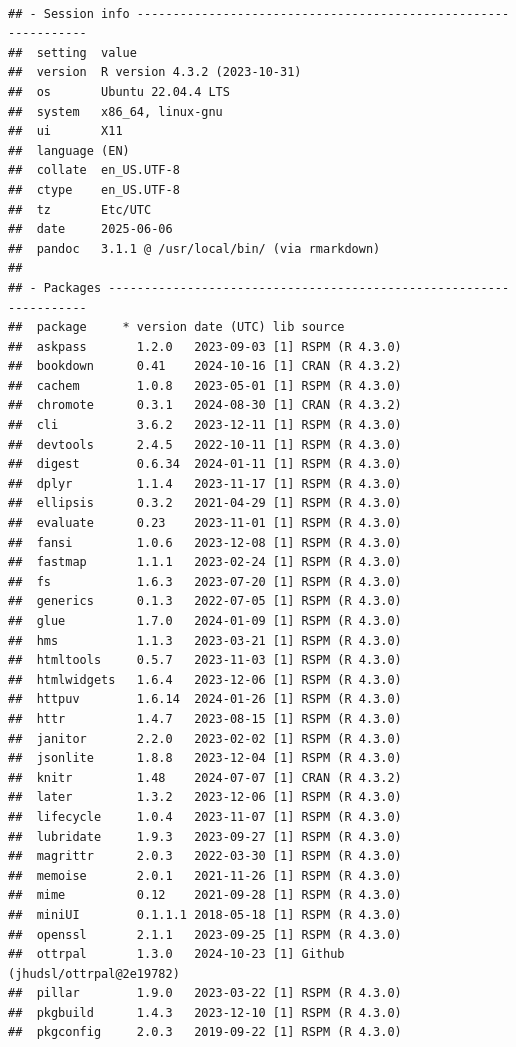 \documentclass[
]{book}
\begin{document}
~

\begin{verbatim}
## - Session info ---------------------------------------------------------------
##  setting  value
##  version  R version 4.3.2 (2023-10-31)
##  os       Ubuntu 22.04.4 LTS
##  system   x86_64, linux-gnu
##  ui       X11
##  language (EN)
##  collate  en_US.UTF-8
##  ctype    en_US.UTF-8
##  tz       Etc/UTC
##  date     2025-06-06
##  pandoc   3.1.1 @ /usr/local/bin/ (via rmarkdown)
## 
## - Packages -------------------------------------------------------------------
##  package     * version date (UTC) lib source
##  askpass       1.2.0   2023-09-03 [1] RSPM (R 4.3.0)
##  bookdown      0.41    2024-10-16 [1] CRAN (R 4.3.2)
##  cachem        1.0.8   2023-05-01 [1] RSPM (R 4.3.0)
##  chromote      0.3.1   2024-08-30 [1] CRAN (R 4.3.2)
##  cli           3.6.2   2023-12-11 [1] RSPM (R 4.3.0)
##  devtools      2.4.5   2022-10-11 [1] RSPM (R 4.3.0)
##  digest        0.6.34  2024-01-11 [1] RSPM (R 4.3.0)
##  dplyr         1.1.4   2023-11-17 [1] RSPM (R 4.3.0)
##  ellipsis      0.3.2   2021-04-29 [1] RSPM (R 4.3.0)
##  evaluate      0.23    2023-11-01 [1] RSPM (R 4.3.0)
##  fansi         1.0.6   2023-12-08 [1] RSPM (R 4.3.0)
##  fastmap       1.1.1   2023-02-24 [1] RSPM (R 4.3.0)
##  fs            1.6.3   2023-07-20 [1] RSPM (R 4.3.0)
##  generics      0.1.3   2022-07-05 [1] RSPM (R 4.3.0)
##  glue          1.7.0   2024-01-09 [1] RSPM (R 4.3.0)
##  hms           1.1.3   2023-03-21 [1] RSPM (R 4.3.0)
##  htmltools     0.5.7   2023-11-03 [1] RSPM (R 4.3.0)
##  htmlwidgets   1.6.4   2023-12-06 [1] RSPM (R 4.3.0)
##  httpuv        1.6.14  2024-01-26 [1] RSPM (R 4.3.0)
##  httr          1.4.7   2023-08-15 [1] RSPM (R 4.3.0)
##  janitor       2.2.0   2023-02-02 [1] RSPM (R 4.3.0)
##  jsonlite      1.8.8   2023-12-04 [1] RSPM (R 4.3.0)
##  knitr         1.48    2024-07-07 [1] CRAN (R 4.3.2)
##  later         1.3.2   2023-12-06 [1] RSPM (R 4.3.0)
##  lifecycle     1.0.4   2023-11-07 [1] RSPM (R 4.3.0)
##  lubridate     1.9.3   2023-09-27 [1] RSPM (R 4.3.0)
##  magrittr      2.0.3   2022-03-30 [1] RSPM (R 4.3.0)
##  memoise       2.0.1   2021-11-26 [1] RSPM (R 4.3.0)
##  mime          0.12    2021-09-28 [1] RSPM (R 4.3.0)
##  miniUI        0.1.1.1 2018-05-18 [1] RSPM (R 4.3.0)
##  openssl       2.1.1   2023-09-25 [1] RSPM (R 4.3.0)
##  ottrpal       1.3.0   2024-10-23 [1] Github (jhudsl/ottrpal@2e19782)
##  pillar        1.9.0   2023-03-22 [1] RSPM (R 4.3.0)
##  pkgbuild      1.4.3   2023-12-10 [1] RSPM (R 4.3.0)
##  pkgconfig     2.0.3   2019-09-22 [1] RSPM (R 4.3.0)

\end{verbatim}
\end{document}

